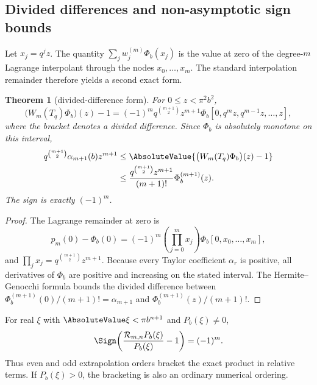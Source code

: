 \documentclass[11pt,oneside]{article}
\numberwithin{equation}{section}
\newtheorem{theorem}{Theorem}[section]
\theoremstyle{definition}
\theoremstyle{remark}
\begin{document}
\subsection{Divided differences and non-asymptotic sign bounds}

Let \(x_j=q^jz\). The quantity
\(\sum_jw_j^{(m)}\Phi_b(x_j)\) is the value at zero of the degree-\(m\)
Lagrange interpolant through the nodes \(x_0,\ldots,x_m\). The standard
interpolation remainder therefore yields a second exact form.

\begin{theorem}[divided-difference form]
\label{p2:thm:divdiff}
For \(0\leq z<\pi^2b^2\),
\begin{equation}
 \bigl(W_m(T_q)\Phi_b\bigr)(z)-1
 =(-1)^m q^{\binom{m+1}{2}}z^{m+1}
 \Phi_b[0,q^mz,q^{m-1}z,\ldots,z],
 \label{p2:eq:divdiff}
\end{equation}
where the bracket denotes a divided difference. Since \(\Phi_b\) is absolutely
monotone on this interval,
\begin{align}
 q^{\binom{m+1}{2}}\alpha_{m+1}(b)z^{m+1}
 &\leq
 \AbsoluteValue{\bigl(W_m(T_q)\Phi_b\bigr)(z)-1}
 \label{p2:eq:lowerbound}\\
 &\leq
 \frac{q^{\binom{m+1}{2}}z^{m+1}}{(m+1)!}
 \Phi_b^{(m+1)}(z).
 \label{p2:eq:upperbound}
\end{align}
The sign is exactly \((-1)^m\).
\end{theorem}

\begin{proof}
The Lagrange remainder at zero is
\[
 p_m(0)-\Phi_b(0)=(-1)^m\left(\prod_{j=0}^mx_j\right)
 \Phi_b[0,x_0,\ldots,x_m],
\]
and \(\prod_jx_j=q^{\binom{m+1}{2}}z^{m+1}\). Because every Taylor
coefficient \(\alpha_r\) is positive, all derivatives of \(\Phi_b\) are positive
and increasing on the stated interval. The Hermite--Genocchi formula bounds the
divided difference between
\(\Phi_b^{(m+1)}(0)/(m+1)!=\alpha_{m+1}\) and
\(\Phi_b^{(m+1)}(z)/(m+1)!\).
\end{proof}

\begin{corollary}
\label{p2:cor:bracket}
For real \(\xi\) with \(\AbsoluteValue\xi<\pi b^{n+1}\) and \(P_b(\xi)\ne0\),
\begin{equation}
 \Sign\!\left(\frac{\mathcal R_{m,n}P_b(\xi)}{P_b(\xi)}-1\right)=(-1)^m.
 \label{p2:eq:signlaw}
\end{equation}
Thus even and odd extrapolation orders bracket the exact product in relative
terms. If \(P_b(\xi)>0\), the bracketing is also an ordinary numerical ordering.
\end{corollary}
\end{document}
